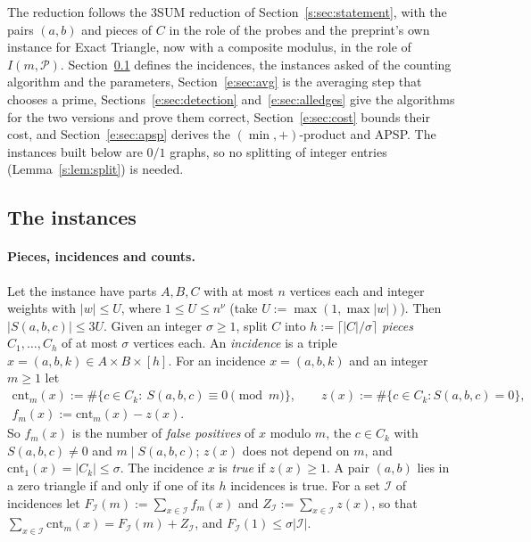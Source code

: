 \documentclass[11pt]{article}
\theoremstyle{definition}
\theoremstyle{remark}
\newcommand{\cnt}{\mathrm{cnt}}
\newcommand{\Pq}{\mathcal{P}}
\newcommand{\Iq}{\mathcal{I}}
\begin{document}
The reduction follows the 3SUM reduction of Section~\ref{s:sec:statement}, with the pairs $(a,b)$ and pieces of $C$ in the role of the probes and the preprint's own instance for Exact Triangle, now with a composite modulus, in the role of $I(m,\Pq)$. Section~\ref{e:sec:instances} defines the incidences, the instances asked of the counting algorithm and the parameters, Section~\ref{e:sec:avg} is the averaging step that chooses a prime, Sections~\ref{e:sec:detection} and~\ref{e:sec:alledges} give the algorithms for the two versions and prove them correct, Section~\ref{e:sec:cost} bounds their cost, and Section~\ref{e:sec:apsp} derives the $(\min,+)$-product and APSP. The instances built below are $0/1$ graphs, so no splitting of integer entries (Lemma~\ref{s:lem:split}) is needed.

\subsection{The instances}\label{e:sec:instances}

\paragraph{Pieces, incidences and counts.} Let the instance have parts $A,B,C$ with at most $n$ vertices each and integer weights with $|w|\le U$, where $1\le U\le n^\nu$ (take $U:=\max(1,\max|w|)$). Then $|S(a,b,c)|\le3U$. Given an integer $\sigma\ge1$, split $C$ into $h:=\lceil|C|/\sigma\rceil$ \emph{pieces} $C_1,\dots,C_h$ of at most $\sigma$ vertices each. An \emph{incidence} is a triple $x=(a,b,k)\in A\times B\times[h]$. For an incidence $x=(a,b,k)$ and an integer $m\ge1$ let
\begin{gather*}
\cnt_m(x):=\#\{c\in C_k:\ S(a,b,c)\equiv0\pmod m\},\qquad z(x):=\#\{c\in C_k: S(a,b,c)=0\},\\
f_m(x):=\cnt_m(x)-z(x).
\end{gather*}
So $f_m(x)$ is the number of \emph{false positives} of $x$ modulo $m$, the $c\in C_k$ with $S(a,b,c)\ne0$ and $m\mid S(a,b,c)$; $z(x)$ does not depend on $m$, and $\cnt_1(x)=|C_k|\le\sigma$. The incidence $x$ is \emph{true} if $z(x)\ge1$. A pair $(a,b)$ lies in a zero triangle if and only if one of its $h$ incidences is true. For a set $\Iq$ of incidences let $F_\Iq(m):=\sum_{x\in\Iq}f_m(x)$ and $Z_\Iq:=\sum_{x\in\Iq}z(x)$, so that $\sum_{x\in\Iq}\cnt_m(x)=F_\Iq(m)+Z_\Iq$, and $F_\Iq(1)\le\sigma|\Iq|$.
\end{document}
